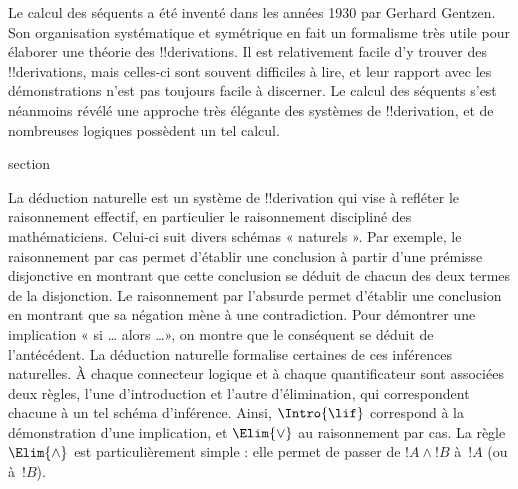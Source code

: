 \documentclass[11pt,a4paper,openany]{memoir}
\begin{document}
Le calcul des séquents a été inventé dans les années 1930 par Gerhard
Gentzen. Son organisation systématique et symétrique en fait un
formalisme très utile pour élaborer une théorie des !!{derivation}s.
Il est relativement facile d'y trouver des !!{derivation}s, mais celles-ci
sont souvent difficiles à lire, et leur rapport avec les démonstrations
n'est pas toujours facile à discerner. Le calcul des séquents s'est
néanmoins révélé une approche très élégante des systèmes de
!!{derivation}, et de nombreuses logiques possèdent un tel calcul.


\endgroup



\begingroup
\expandafter\def\csname ol@sectioncs\endcsname{section}
\def\olfilename{natural-deduction}


      {}
      {}


La déduction naturelle est un système de !!{derivation} qui vise à
refléter le raisonnement effectif, en particulier le raisonnement
discipliné des mathématiciens. Celui-ci suit divers schémas « naturels ».
Par exemple, le raisonnement par cas permet d'établir une conclusion à
partir d'une prémisse disjonctive en montrant que cette conclusion se
déduit de chacun des deux termes de la disjonction. Le raisonnement par
l'absurde permet d'établir une conclusion en montrant que sa négation
mène à une contradiction. Pour démontrer une implication « si \dots
alors \dots », on montre que le conséquent se déduit de l'antécédent.
La déduction naturelle formalise certaines de ces inférences naturelles.
À chaque connecteur logique et à chaque quantificateur sont associées
deux règles, l'une d'introduction et l'autre d'élimination, qui
correspondent chacune à un tel schéma d'inférence. Ainsi,
$\Intro{\lif}$ correspond à la démonstration d'une implication, et
$\Elim{\lor}$ au raisonnement par cas. La règle $\Elim{\land}$ est
particulièrement simple : elle permet de passer de $!A \land !B$ à~$!A$
(ou à~$!B$).
\end{document}
